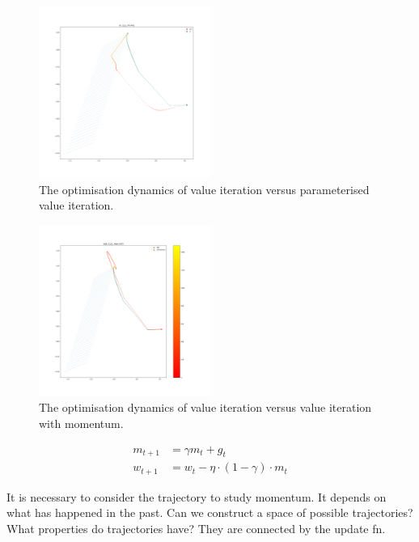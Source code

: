 \begin{figure}
\centering
\includegraphics[width=0.5\textwidth,height=0.5\textheight]{../../pictures/figures/vi-vs-pvi.png}
\caption{The optimisation dynamics of value iteration versus parameterised value iteration.}
\end{figure}

\begin{figure}
\centering
\includegraphics[width=0.5\textwidth,height=0.5\textheight]{../../pictures/figures/vi_sgd-vs-vi_mom.png}
\caption{The optimisation dynamics of value iteration versus value iteration with momentum.}
\end{figure}




\begin{align}
m_{t+1} &= \gamma m_t + g_t \\
w_{t+1} &= w_t - \eta \cdot (1-\gamma) \cdot m_t
\end{align}

It is necessary to consider the trajectory to study momentum. It depends
on what has happened in the past. Can we construct a space of possible
trajectories? What properties do trajectories have? They are connected
by the update fn.

%


